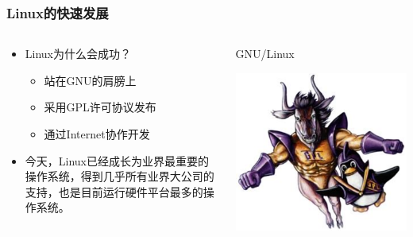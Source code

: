 \documentclass[xcolor=svgnames,presentation]{beamer}
\begin{document}
\begin{frame}
\frametitle{Linux的快速发展}
\label{sec-2-3-2}
\begin{columns}
\begin{column}{0.6\textwidth}
\label{sec-2-3-2-1}
\begin{itemize}

\item Linux为什么会成功？
\label{sec-2-3-2-2}%
\begin{itemize}

\item 站在GNU的肩膀上
\label{sec-2-3-2-2-1}%

\item 采用GPL许可协议发布
\label{sec-2-3-2-2-2}%

\item 通过Internet协作开发
\label{sec-2-3-2-2-3}%
\end{itemize} %

\item 今天，Linux已经成长为业界最重要的操作系统，得到几乎所有业界大公司的支持，也是目前运行硬件平台最多的操作系统。
\label{sec-2-3-2-3}%
\end{itemize} %
\end{column}
\begin{column}{0.4\textwidth}
\begin{exampleblock}{GNU/Linux}
\label{sec-2-3-2-4}

\includegraphics[width=1\textwidth]{img/gnu-linux.jpg}
\end{exampleblock}
\end{column}
\end{columns}
\end{frame}
\end{document}
